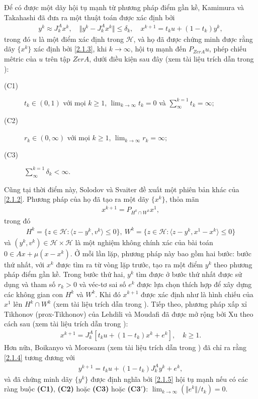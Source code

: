 \documentclass[14pt, oneside,A4paper]{book}
\theoremstyle{plain}
\begin{document}
	Để có được một dãy hội tụ mạnh từ phương pháp điểm gần kề, Kamimura và Takahashi đã đưa ra một thuật toán được xác định bởi
\begin{align} \label{2.1.3}
	y^{k}\approx J^A_{k}x^{k}, \quad \Vert y^{k}-J^A_{k}x^{k} \Vert\leq  \delta _{k}, \quad x^{k+1}=t_{k}u+(1-t_{k})y^{k},
\end{align}
trong đó $u$ là một điểm xác định trong $\mathcal H$, và họ đã được chứng minh được rằng dãy $\{ x^{k} \}$ xác định bởi \eqref{2.1.3}, khi $k\rightarrow \infty$, hội tụ mạnh đến $P_{ZerA}u$, phép chiếu mêtric của $u$ trên tập $ZerA$, dưới điều kiện sau đây (xem tài liệu trích dẫn trong \cite{BHN}):
\begin{description}
	\item[(C1)] $t_{k}\in (0,1)$ với mọi $k\geq 1$, $ \lim_{k \rightarrow \infty}t_{k}=0$ và $\sum_{\infty}^{k=1}t_{k}=\infty;$ 
	\item[(C2)] $r_{k}\in (0,\infty)$ với mọi $k\geq 1$, $ \lim_{k \rightarrow \infty}r_{k}=\infty;$
	\item[(C3)] $\sum_{\infty}^{k=1}\delta_{k}<\infty.$ 
\end{description}
Cũng tại thời điểm này, Solodov và Svaiter đề xuất một phiên bản khác của \eqref{2.1.2}. Phương pháp của họ đã tạo ra một dãy $\{x^{k}\}$, thỏa mãn
\begin{align*}
x^{k+1}=P_{H^{k}\cap W^{k}}x^{1},
\end{align*}
trong đó 
\begin{align*}
H^{k}=\lbrace z \in \mathcal H:\langle z-y^{k},v^{k} \rangle \leq 0\rbrace, \ W^{k}=\lbrace z \in \mathcal H:\langle z-y^{k},x^{1}-x^{k} \rangle \leq 0\rbrace
\end{align*}
và $(y^{k},v^{k})\in \mathcal H\times \mathcal H$ là một nghiệm không chính xác của bài toán $0 \in Ax+\mu (x-x^{k})$. Ở mỗi lần lặp, phương pháp này bao gồm hai bước: bước thứ nhất, với $x^{k}$ được tìm ra từ vòng lặp trước, tạo ra một điểm $y^{k}$ theo phương pháp điểm gần kề. Trong bước thứ hai, $y^{k}$ tìm được ở bước thứ nhất được sử dụng và tham số $r_{k}>0$ và véc-tơ sai số $e^{k}$ được lựa chọn thích hợp để xây dựng các không gian con $H^{k}$ và $W^{k}$. Khi đó $x^{k+1}$ được xác định như là hình chiếu của $x^{1}$ lên $H^{k}\cap W^{k}$ (xem tài liệu trích dẫn trong \cite{BHN}). Tiếp theo, phương pháp xấp xỉ Tikhonov (prox-Tikhonov) của Lehdili và Moudafi đã được mở rộng bởi Xu theo cách sau (xem tài liệu trích dẫn trong \cite{BHN}):
\begin{align} \label{2.1.4}
x^{k+1}=J^A_{k}[t_{k}u+(1-t_{k})x^{k}+e^{k}],\quad k\geq 1.
\end{align}
Hơn nữa, Boikanyo và Morosanu (xem tài liệu trích dẫn trong \cite{BHN}) đã chỉ ra rằng \eqref{2.1.4} tương đương với
\begin{align} \label{2.1.5}
y^{k+1}=t_{k}u+(1-t_{k})J^A_{k}y^{k}+e^{k},
\end{align}
và đã chứng minh dãy $\{y^{k}\}$  được định nghĩa bởi \eqref{2.1.5} hội tụ mạnh nếu có các ràng buộc {\bf (C1)}, {\bf (C2)} hoặc {\bf (C3)} hoặc {\bf (C3$'$)}:   $\lim_{k \rightarrow \infty}(\Vert e^{k} \Vert / t_{k})=0.$
\end{document}
